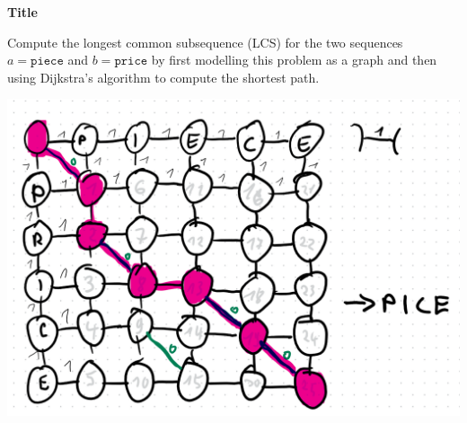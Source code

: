 \question \textbf{Title}

Compute the longest common subsequence (LCS) for the two sequences $a = \texttt{piece}$ and $b = \texttt{price}$ by first modelling this problem as a graph and then using Dijkstra's algorithm to compute the shortest path.

\begin{solution}

\includegraphics[width=0.8\linewidth]{task_4/sheet09_a4.png}
\end{solution}